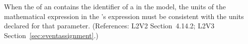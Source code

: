 When the   of an \EventAssignment
contains the identifier of a \Parameter in the model, the
units of the mathematical expression in the
\EventAssignment's  expression must be
consistent with the units declared for that parameter.
(References: L2V2 Section~4.14.2; L2V3 Section~\ref{sec:eventassignment}.)
